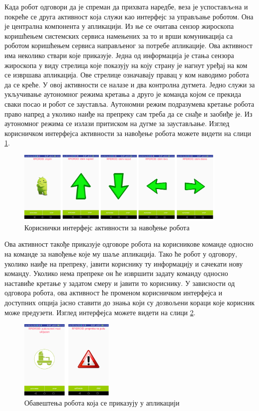 \documentclass[12pt,oneside]{memoir}
\theoremstyle{remark}
\begin{document}
Када робот одговори да је спреман да прихвата наредбе, веза је успостављeна и покреће се друга активност која служи као интерфејс за управљање роботом. Она је централна компонента у апликацији. Из ње се очитава сензор жироскопа коришћењем системских сервиса намењених за то и врши комуникација са роботом коришћењем сервиса направљеног за потребе апликације. Ова активност има неколико ствари које приказује. Једна од информација је стања сензора жироскопа у виду стрелица које показују на коју страну је нагнут уређај на ком се извршава апликација. Ове стрелице означавају правац у ком наводимо робота да се креће. У овој активности се налазе и два контролна дугмета. Једно служи за укључивање аутономног режима кретања а друго је команда којом се прекида сваки посао и робот се зауставља. Аутономни режим подразумева кретање робота право напред а уколико наиђе на препреку сам треба да се снађе и заобиђе је. Из аутономног режима се излази притиском на дугме за заустављање. Изглед корисничком интерфејса активности за навођење робота можете видети на слици \ref{fig:uiactivity2}.

\begin{figure}[!ht]
\centering
\includegraphics[width=0.9\textwidth]{slike/activity2.png}
\caption{Кориснички интерфејс активности за навођење робота}
\label{fig:uiactivity2}
\end{figure}

Ова активност такође приказује одговоре робота на корисникове команде односно на команде за навођење које му шаље апликација. Тако ће робот у одговору, уколико наиђе на препреку, јавити кориснику ту информацију и сачекати нову команду. Уколико нема препреке он ће извршити задату команду односно наставиће кретање у задатом смеру и јавити то кориснику. У зависности од одговора робота, ова активност ће променом корисничком интерфејса и доступних опција јасно ставити до знања који су дозвољени кораци које корисник може предузети. Изглед интерфејса можете видети на слици \ref{fig:uiactivity21}.

\begin{figure}[!ht]
\centering
\includegraphics[width=0.4\textwidth]{slike/autoistop.png}
\caption{Обавештења робота која се приказују у апликацији}
\label{fig:uiactivity21}
\end{figure}
\end{document}
